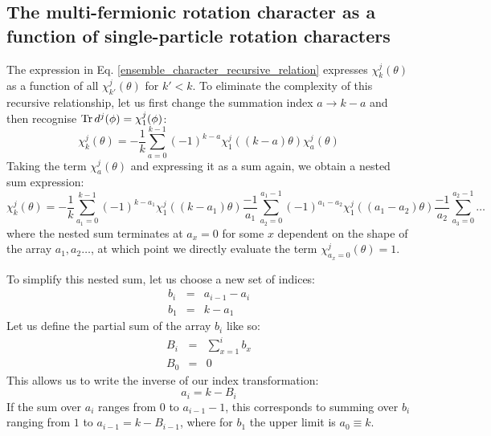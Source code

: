 \documentclass[12pt]{article}
\begin{document}
	\subsection{The multi-fermionic rotation character as a function of single-particle rotation characters}
	The expression in Eq. \ref{ensemble_character_recursive_relation} expresses $\chi^j_k(\theta)$ as a function of all $\chi^j_{k'}(\theta)$ for $k'<k$. To eliminate the complexity of this recursive relationship, let us first change the summation index $a\rightarrow k-a$ and then recognise $\Tr d^j(\phi)=\chi^j_1(\phi)$:
	\begin{equation}
	\chi^j_k(\theta)=-\frac{1}{k}\sum_{a=0}^{k-1} (-1)^{k-a}\chi^j_1((k-a)\theta)\chi^j_{a}(\theta)
	\end{equation}
	Taking the term $\chi^j_{a}(\theta)$ and expressing it as a sum again, we obtain a nested sum expression:
	\begin{equation} \label{nested_sum_a}
	\chi^j_k(\theta)=-\frac{1}{k}\sum_{a_1=0}^{k-1} (-1)^{k-a_1}\chi^j_1((k-a_1)\theta)\frac{-1}{a_1}\sum_{a_2=0}^{a_1-1} (-1)^{a_1-a_2}\chi^j_1((a_1-a_2)\theta)\frac{-1}{a_2}\sum_{a_3=0}^{a_2-1}\dots
	\end{equation}
	where the nested sum terminates at $a_x=0$ for some $x$ dependent on the shape of the array $a_1, a_2\dots$, at which point we directly evaluate the term $\chi^j_{a_x=0}(\theta)=1$.
	
	To simplify this nested sum, let us choose a new set of indices:
	\begin{eqnarray}
	b_i &=& a_{i-1} - a_i\\
	b_1 &=& k - a_1
	\end{eqnarray}
	Let us define the partial sum of the array $b_i$ like so:
	\begin{eqnarray}
	B_i &=& \sum_{x=1}^i b_x\\
	B_0 &=& 0
	\end{eqnarray}
	This allows us to write the inverse of our index transformation:
	\begin{equation}
	a_i = k - B_i
	\end{equation}
	If the sum over $a_i$ ranges from $0$ to $a_{i-1}-1$, this corresponds to summing over $b_i$ ranging from $1$ to $a_{i-1}=k-B_{i-1}$, where for $b_1$ the upper limit is $a_0\equiv k$.
	
\end{document}
